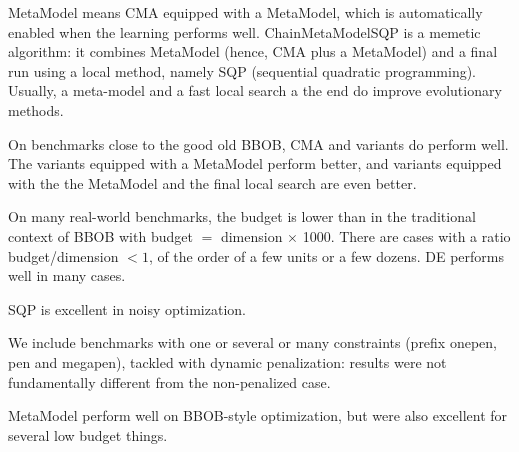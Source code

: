 MetaModel means CMA equipped with a MetaModel, which is automatically enabled when the learning performs well.
ChainMetaModelSQP is a memetic algorithm: it combines MetaModel (hence, CMA plus a MetaModel) and a final run using a local method, namely SQP (sequential quadratic programming).
Usually, a meta-model and a fast local search a the end do improve evolutionary methods.

On benchmarks close to the good old BBOB, CMA and variants do perform well. The variants equipped with a MetaModel perform better, and
variants equipped with the the MetaModel and the final local search are even better.

On many real-world benchmarks, the budget is lower than in the traditional context of BBOB with budget $=$ dimension $\times$ 1000. There
are cases with a ratio budget/dimension $<1$, of the order of a few units or a few dozens. DE performs well in many cases.

SQP is excellent in noisy optimization. 

We include benchmarks with one or several or many constraints (prefix onepen, pen and megapen), tackled with dynamic penalization: results were not fundamentally different from the non-penalized case. 

MetaModel perform well on BBOB-style optimization, but were also excellent for several low budget things.
